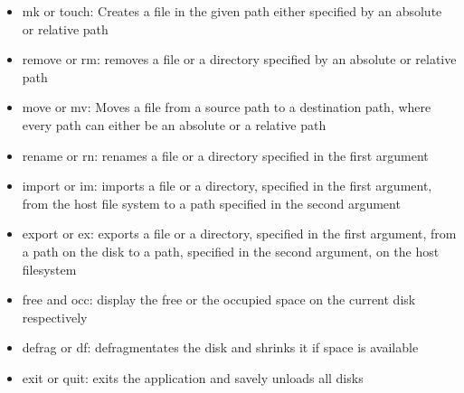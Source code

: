 \documentclass{report}
\begin{document}
\begin{itemize}
\item mk or touch: Creates a file in the given path either specified by an absolute or relative path
\item remove or rm: removes a file or a directory specified by an absolute or relative path
\item move or mv: Moves a file from a source path to a destination path, where every path can either be an absolute or a relative path
\item rename or rn: renames a file or a directory specified in the first argument
\item import or im: imports a file or a directory, specified in the first argument, from the host file system to a path specified in the second argument
\item export or ex: exports a file or a directory, specified in the first argument, from a path on the disk to a path, specified in the second argument, on the host filesystem
\item free and occ: display the free or the occupied space on the current disk respectively
\item defrag or df: defragmentates the disk and shrinks it if space is available
\item exit or quit: exits the application and savely unloads all disks
\end{itemize}
\end{document}
